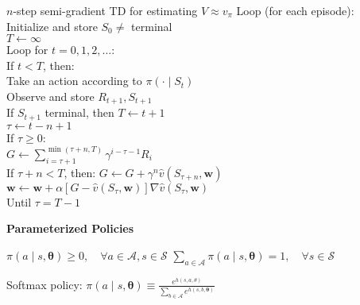 \documentclass[twocolumn]{article}
\begin{document}
\begin{mydef}{$n$-step semi-gradient TD for estimating $V \approx v_\pi$}{}
    Loop (for each episode): \\
        \hspace*{2em}Initialize and store $S_0 \neq$ terminal \\
        \hspace*{2em}$T \leftarrow \infty$ \\
        \hspace*{2em}Loop for $t=0,1,2,\dots$: \\
            \hspace*{4em}If $t < T$, then: \\
                \hspace*{6em}Take an action according to $\pi(\cdot \mid S_t)$ \\
                \hspace*{6em}Observe and store $R_{t+1}, S_{t+1}$ \\
                \hspace*{6em}If $S_{t+1}$ terminal, then $T \leftarrow t+1$ \\
            \hspace*{4em}$\tau \leftarrow t-n+1$ \\
            \hspace*{4em}If $\tau \geq 0$: \\
                \hspace*{6em}$G \leftarrow \sum_{i=\tau+1}^{\min (\tau+n, T)} \gamma^{i-\tau-1} R_i$ \\
                \hspace*{6em}If $\tau + n < T$, then: $G \leftarrow G + \gamma^n \hat v(S_{\tau+n}, \mathbf w)$ \\
                \hspace*{6em}$\mathbf w \leftarrow \mathbf w + \alpha [G-\hat v(S_\tau, \mathbf w)] \nabla \hat v(S_\tau, \mathbf w)$ \\
        \hspace*{2em}Until $\tau=T-1$
\end{mydef} \vspace{-0.5em}

\dotfill

\textbf{Parameterized Policies}

$\pi(a \mid s, \boldsymbol \theta) \geq 0, \quad \forall a \in \mathcal A, s \in \mathcal S$ \hfill $\sum_{a \in \mathcal A} \pi(a \mid s, \boldsymbol \theta) = 1, \quad \forall s \in \mathcal S$

Softmax policy: $\pi(a \mid s, \boldsymbol \theta) \equiv \frac{e^{h(s,a, \theta)}}{\sum_{b\in \mathcal A} e^{h(s, b, \boldsymbol \theta)}}$
\end{document}
